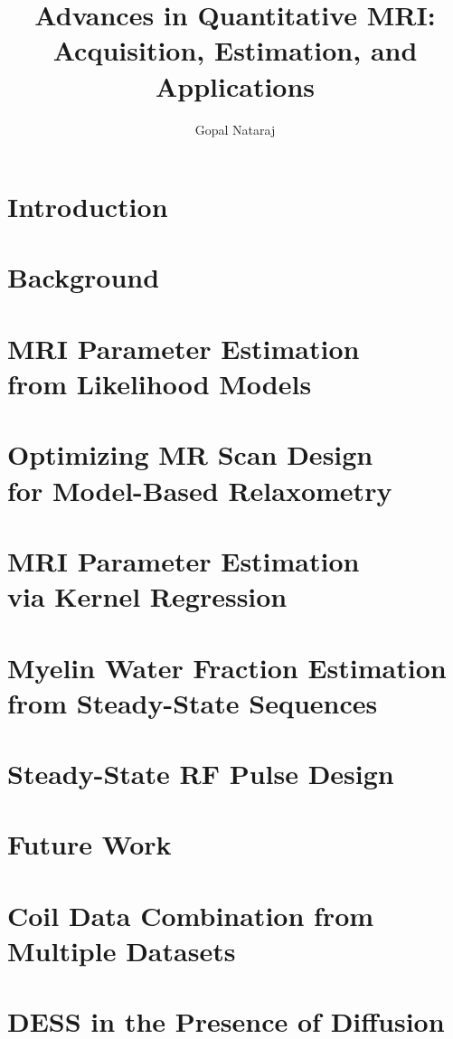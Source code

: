 \documentclass[thesis]{../cls/thesis-umich}
\title{
	Advances in Quantitative MRI: \\
	Acquisition,
	Estimation,
	and 
	Applications
}
\author{Gopal Nataraj}
\begin{document}
\chapter{Introduction}
\label{c,intro}


\chapter{Background}
\label{c,bkgrd}


\chapter{MRI Parameter Estimation \\ from Likelihood Models}
\label{c,relax}


\chapter{Optimizing MR Scan Design \\ for Model-Based Relaxometry}
\label{c,scn-dsgn}


\chapter{MRI Parameter Estimation \\ via Kernel Regression}
\label{c,krr}


\chapter{Myelin Water Fraction Estimation \\ from Steady-State Sequences}
\label{c,mwf}


\chapter{Steady-State RF Pulse Design}
\label{c,ss-rf}


\chapter{Future Work}
\label{c,future}


\appendix
\chapter{Coil Data Combination from Multiple Datasets}
\label{a,cc-multi}


\chapter{DESS in the Presence of Diffusion}
\label{a,dess-diff}




\end{document}

